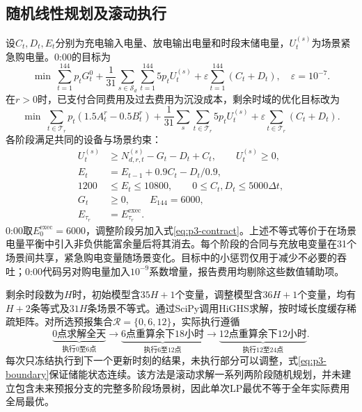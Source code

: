 \subsection{随机线性规划及滚动执行}
设$C_t,D_t,E_t$分别为充电输入电量、放电输出电量和时段末储电量，$U^{(s)}_t$为场景紧急购电量。0:00的目标为
\begin{equation}
\min\ \sum_{t=1}^{144}p_tG^0_t
+\frac1{31}\sum_{s\in\mathcal S_d}\sum_{t=1}^{144}5p_tU^{(s)}_t
+\varepsilon\sum_{t=1}^{144}(C_t+D_t),\quad\varepsilon=10^{-7}.
\label{eq:p3-init}
\end{equation}
在$r>0$时，已支付合同费用及过去费用为沉没成本，剩余时域的优化目标改为
\begin{equation}
\min\ \sum_{t\in\mathcal T_r}p_t(1.5A^r_t-0.5B^r_t)
+\frac1{31}\sum_s\sum_{t\in\mathcal T_r}5p_tU^{(s)}_t
+\varepsilon\sum_{t\in\mathcal T_r}(C_t+D_t).
\label{eq:p3-roll}
\end{equation}
各阶段满足共同的设备与场景约束：
\begin{align}
U^{(s)}_t&\geq N^{(s)}_{d,r,t}-G_t-D_t+C_t,\qquad U^{(s)}_t\geq0,\\
E_t&=E_{t-1}+0.9C_t-D_t/0.9,\\
1200&\leq E_t\leq10800,\qquad 0\leq C_t,D_t\leq5000\Delta t,\\
G_t&\geq0,\qquad E_{144}=6000,\\
E_{\tau_r}&=E^{\mathrm{exec}}_{\tau_r}.\label{eq:p3-boundary}
\end{align}
0:00取$E^{\mathrm{exec}}_0=6000$，调整阶段另加入式\eqref{eq:p3-contract}。上述不等式等价于在场景电量平衡中引入非负供能富余量后将其消去。每个阶段的合同与充放电变量在31个场景间共享，紧急购电变量随场景变化。目标中的小惩罚仅用于减少不必要的吞吐；0:00代码另对购电量加入$10^{-9}$系数增量，报告费用均剔除这些数值辅助项。

剩余时段数为$H$时，初始模型含$35H+1$个变量，调整模型含$36H+1$个变量，均有$H+2$条等式及$31H$条场景不等式。通过SciPy调用HiGHS求解，按时域长度缓存稀疏矩阵。对所选预报集合$\mathcal R=\{0,6,12\}$，实际执行遵循
\begin{equation}
\underbrace{\text{0点求解全天}}_{\text{执行0至6点}}
\longrightarrow
\underbrace{\text{6点重算余下18小时}}_{\text{执行6至12点}}
\longrightarrow
\underbrace{\text{12点重算余下12小时}}_{\text{执行12至24点}}.
\end{equation}
每次只冻结执行到下一个更新时刻的结果，未执行部分可以调整，式\eqref{eq:p3-boundary}保证储能状态连续。该方法是滚动求解一系列两阶段随机规划，并未建立包含未来预报分支的完整多阶段场景树，因此单次LP最优不等于全年实际费用全局最优。

